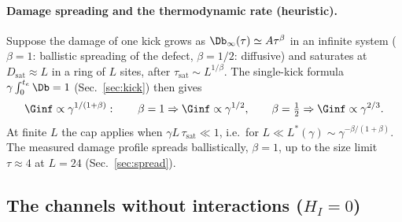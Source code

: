 \paragraph{Damage spreading and the thermodynamic rate (heuristic).} Suppose the damage of one kick grows as $\Db_\infty(\tau) \simeq A\tau^\beta$ in an infinite system ($\beta = 1$: ballistic spreading of the defect, $\beta = 1/2$: diffusive) and saturates at $D_{\mathrm{sat}} \approx L$ in a ring of $L$ sites, after $\tau_{\mathrm{sat}} \sim L^{1/\beta}$. The single-kick formula $\gamma\int_0^{t_e}\Db = 1$ (Sec.~\ref{sec:kick}) then gives
\begin{equation}
\Ginf \propto \gamma^{1/(1+\beta)}: \qquad \beta = 1 \Rightarrow \Ginf \propto \gamma^{1/2}, \qquad \beta = \tfrac12 \Rightarrow \Ginf \propto \gamma^{2/3}.
\end{equation}
At finite $L$ the cap applies when $\gamma L\,\tau_{\mathrm{sat}} \ll 1$, i.e.\ for $L \ll L^*(\gamma) \sim \gamma^{-\beta/(1+\beta)}$. The measured damage profile spreads ballistically, $\beta = 1$, up to the size limit $\tau \approx 4$ at $L = 24$ (Sec.~\ref{sec:spread}).

\subsection{The channels without interactions ($H_I = 0$)}
\label{sec:theory-channels}

